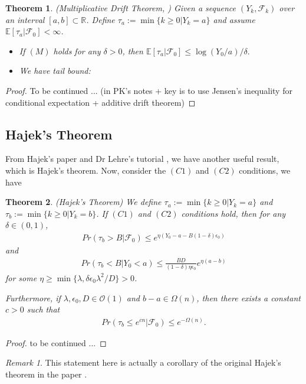 \documentclass[a4paper,11pt]{report}
\theoremstyle{plain} %
\newtheorem{thm}{Theorem}[section]
\theoremstyle{definition} %
\theoremstyle{remark} %
\newtheorem*{rem}{Remark}
\begin{document}
\begin{thm}(Multiplicative Drift Theorem, \citep{lehre_general_2018})
Given a sequence $(Y_{k},\mathcal{F}_{k})$ over an interval $[a,b]\subset \mathbb{R}$. Define $\tau_{a} :=\min\{k \geq 0 | Y_{k}=a \}$ and assume $\mathbb{E}[\tau_{a} | \mathcal{F}_{0}]<\infty$. 
\begin{itemize}
    \item If $(M)$ holds for any $\delta >0$, then  $\mathbb{E}[\tau_{a} | \mathcal{F}_{0}]\leq  \log(Y_{0} / a) / \delta.$
    \item We have tail bound:
\end{itemize}

\end{thm}
\begin{proof}
To be continued ... (in PK's notes + key is to use Jensen's inequality for conditional expectation + additive drift theorem)
\end{proof}

\subsection{Hajek's Theorem}
From Hajek's paper\citep{hajek1982hitting} and Dr Lehre's tutorial \citep{Per}, we have another useful result, which is Hajek's theorem. Now, consider the $(C1)$ and $(C2)$ conditions, we have
\begin{thm}(Hajek's Theorem) We define $\tau_{a} :=\min\{k \geq 0 | Y_{k}=a \}$ and $\tau_{b} :=\min\{k \geq 0 | Y_{k}=b\}$.  If $(C1)$ and $(C2)$ conditions hold, then for any $\delta \in (0,1)$,
\begin{align*}
    Pr(\tau_{b}>B | \mathcal{F}_{0}) \leq e^{\eta( Y_{0}-a-B(1-\delta)\epsilon_{0})} 
\end{align*}
and 
\begin{align*}
    Pr(\tau_{b} <B | Y_{0}<a) \leq \frac{BD}{(1-\delta)\eta \epsilon_{0}}e^{\eta (a-b)}
\end{align*}
for some $\eta \geq \min\{\lambda, \delta \epsilon_{0}\lambda^2 /D \} >0$. 
\par Furthermore, if $\lambda, \epsilon_{0}, D \in \mathcal{O}(1)$ and $b-a \in \Omega(n)$, then there exists a constant $c>0$ such that 
\begin{align*}
Pr(\tau_{b} \leq e^{cn}| \mathcal{F}_{0}) \leq e^{-\Omega(n)}.     
\end{align*}

\end{thm}
\begin{proof}
to be continued ...
\end{proof}
\begin{rem}
This statement here is actually a corollary of the original Hajek's theorem in the paper \citep{hajek1982hitting}. 
\end{rem}
\end{document}
